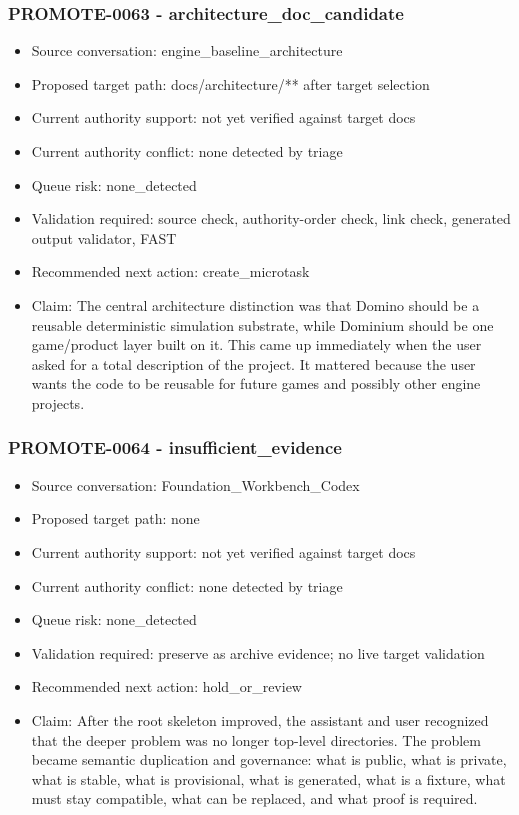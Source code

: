 \documentclass[11pt,a4paper]{report}
\begin{document}
\subsubsection{PROMOTE-0063 - architecture\_doc\_candidate}

\begin{itemize}
\item Source conversation: engine\_baseline\_architecture
\item Proposed target path: docs/architecture/** after target selection
\item Current authority support: not yet verified against target docs
\item Current authority conflict: none detected by triage
\item Queue risk: none\_detected
\item Validation required: source check, authority-order check, link check, generated output validator, FAST
\item Recommended next action: create\_microtask
\item Claim: The central architecture distinction was that Domino should be a reusable deterministic simulation substrate, while Dominium should be one game/product layer built on it. This came up immediately when the user asked for a total description of the project. It mattered because the user wants the code to be reusable for future games and possibly other engine projects.
\end{itemize}

\subsubsection{PROMOTE-0064 - insufficient\_evidence}

\begin{itemize}
\item Source conversation: Foundation\_Workbench\_Codex
\item Proposed target path: none
\item Current authority support: not yet verified against target docs
\item Current authority conflict: none detected by triage
\item Queue risk: none\_detected
\item Validation required: preserve as archive evidence; no live target validation
\item Recommended next action: hold\_or\_review
\item Claim: After the root skeleton improved, the assistant and user recognized that the deeper problem was no longer top-level directories. The problem became semantic duplication and governance: what is public, what is private, what is stable, what is provisional, what is generated, what is a fixture, what must stay compatible, what can be replaced, and what proof is required.
\end{itemize}
\end{document}
